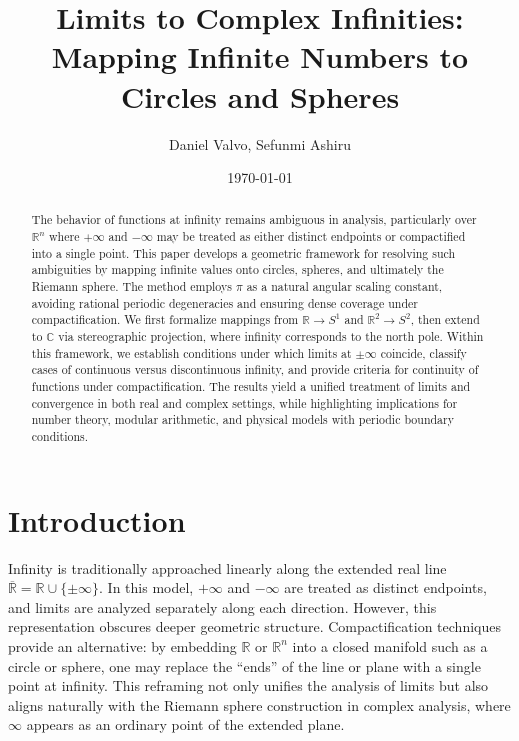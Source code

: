 \documentclass[12pt]{article}
\theoremstyle{remark}
\begin{document}
\title{Limits to Complex Infinities:\\ Mapping Infinite Numbers to Circles and Spheres}
\author{Daniel Valvo, Sefunmi Ashiru}
\date{\today}

\maketitle

\begin{abstract}
    The behavior of functions at infinity remains ambiguous in analysis, particularly over $\mathbb{R}^n$ where $+\infty$ and $-\infty$ may be treated as either distinct endpoints or compactified into a single point. This paper develops a geometric framework for resolving such ambiguities by mapping infinite values onto circles, spheres, and ultimately the Riemann sphere. The method employs $\pi$ as a natural angular scaling constant, avoiding rational periodic degeneracies and ensuring dense coverage under compactification. We first formalize mappings from $\mathbb{R} \to S^1$ and $\mathbb{R}^2 \to S^2$, then extend to $\mathbb{C}$ via stereographic projection, where infinity corresponds to the north pole. Within this framework, we establish conditions under which limits at $\pm\infty$ coincide, classify cases of continuous versus discontinuous infinity, and provide criteria for continuity of functions under compactification. The results yield a unified treatment of limits and convergence in both real and complex settings, while highlighting implications for number theory, modular arithmetic, and physical models with periodic boundary conditions.
\end{abstract}

\tableofcontents

\section{Introduction}
Infinity is traditionally approached linearly along the extended real line 
$\overline{\mathbb{R}} = \mathbb{R} \cup \{\pm \infty\}$. In this model, $+\infty$ and 
$-\infty$ are treated as distinct endpoints, and limits are analyzed separately along 
each direction. However, this representation obscures deeper geometric structure. 
Compactification techniques provide an alternative: by embedding $\mathbb{R}$ or 
$\mathbb{R}^n$ into a closed manifold such as a circle or sphere, one may replace 
the “ends” of the line or plane with a single point at infinity. This reframing 
not only unifies the analysis of limits but also aligns naturally with the 
Riemann sphere construction in complex analysis, where $\infty$ appears as an 
ordinary point of the extended plane.  
\end{document}

